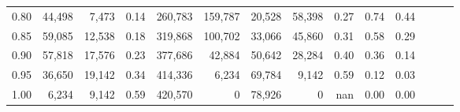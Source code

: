\begin{tabular}{rrrrrrrrrrrrrr}
0.80 &  44,498 &   7,473 &  0.14 &  260,783 &  159,787 &  20,528 &  58,398 &  0.27 &  0.74 &      0.44 \\
0.85 &  59,085 &  12,538 &  0.18 &  319,868 &  100,702 &  33,066 &  45,860 &  0.31 &  0.58 &      0.29 \\
0.90 &  57,818 &  17,576 &  0.23 &  377,686 &   42,884 &  50,642 &  28,284 &  0.40 &  0.36 &      0.14 \\
0.95 &  36,650 &  19,142 &  0.34 &  414,336 &    6,234 &  69,784 &   9,142 &  0.59 &  0.12 &      0.03 \\
1.00 &   6,234 &   9,142 &  0.59 &  420,570 &        0 &  78,926 &       0 &   nan &  0.00 &      0.00 \\
\bottomrule
\end{tabular}
